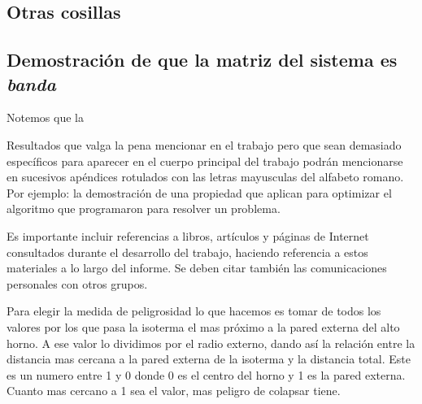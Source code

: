 \documentclass[11pt, a4paper, spanish]{article}
\theoremstyle{plain}
\theoremstyle{remark}
\begin{document}
\begin{appendices}
  \section{Otras cosillas}

    \subsection{Demostración de que la matriz del sistema es \emph{banda}}
      Notemos que la

    Resultados que valga la pena mencionar en el trabajo pero que sean demasiado específicos para aparecer en el cuerpo principal del trabajo podrán mencionarse en sucesivos apéndices rotulados con las letras mayusculas del alfabeto romano. Por ejemplo: la demostración de una propiedad que aplican para optimizar el algoritmo que programaron para resolver un problema.

\end{appendices}

\newpage

\printbibliography[heading=bibintoc]

  Es importante incluir referencias a libros, artículos y páginas de Internet consultados durante el desarrollo del trabajo, haciendo referencia a estos materiales a lo largo del informe.
  Se deben citar también las comunicaciones personales con otros grupos.


Para elegir la medida de peligrosidad lo que hacemos es tomar de todos los valores por los que pasa la isoterma el mas próximo a la pared externa del alto horno.  A ese valor lo dividimos por el radio externo, dando así la relación entre la distancia mas cercana a la pared externa  de la isoterma y la distancia total.
Este es un numero entre 1 y 0 donde 0 es el centro del horno y 1 es la pared externa. Cuanto mas cercano a 1 sea el valor, mas peligro de colapsar tiene. 
\end{document}
